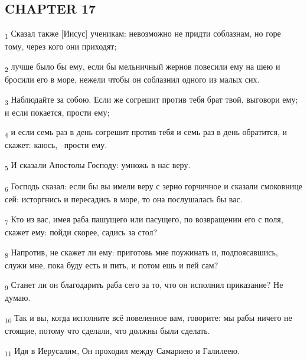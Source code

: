 \subsection{CHAPTER 17}
\begin{tcolorbox}
\textsubscript{1} Сказал также [Иисус] ученикам: невозможно не придти соблазнам, но горе тому, через кого они приходят;
\end{tcolorbox}
\begin{tcolorbox}
\textsubscript{2} лучше было бы ему, если бы мельничный жернов повесили ему на шею и бросили его в море, нежели чтобы он соблазнил одного из малых сих.
\end{tcolorbox}
\begin{tcolorbox}
\textsubscript{3} Наблюдайте за собою. Если же согрешит против тебя брат твой, выговори ему; и если покается, прости ему;
\end{tcolorbox}
\begin{tcolorbox}
\textsubscript{4} и если семь раз в день согрешит против тебя и семь раз в день обратится, и скажет: каюсь, --прости ему.
\end{tcolorbox}
\begin{tcolorbox}
\textsubscript{5} И сказали Апостолы Господу: умножь в нас веру.
\end{tcolorbox}
\begin{tcolorbox}
\textsubscript{6} Господь сказал: если бы вы имели веру с зерно горчичное и сказали смоковнице сей: исторгнись и пересадись в море, то она послушалась бы вас.
\end{tcolorbox}
\begin{tcolorbox}
\textsubscript{7} Кто из вас, имея раба пашущего или пасущего, по возвращении его с поля, скажет ему: пойди скорее, садись за стол?
\end{tcolorbox}
\begin{tcolorbox}
\textsubscript{8} Напротив, не скажет ли ему: приготовь мне поужинать и, подпоясавшись, служи мне, пока буду есть и пить, и потом ешь и пей сам?
\end{tcolorbox}
\begin{tcolorbox}
\textsubscript{9} Станет ли он благодарить раба сего за то, что он исполнил приказание? Не думаю.
\end{tcolorbox}
\begin{tcolorbox}
\textsubscript{10} Так и вы, когда исполните всё повеленное вам, говорите: мы рабы ничего не стоящие, потому что сделали, что должны были сделать.
\end{tcolorbox}
\begin{tcolorbox}
\textsubscript{11} Идя в Иерусалим, Он проходил между Самариею и Галилеею.
\end{tcolorbox}
